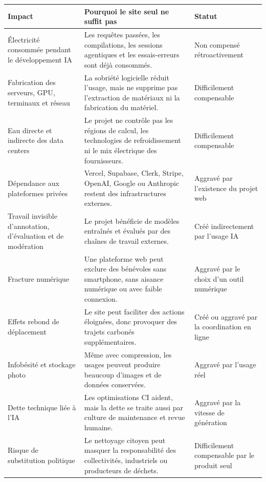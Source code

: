\documentclass[
  10pt,
  a4paper,
  DIV=11,
  numbers=noendperiod,
  oneside]{scrreprt}
\newcounter{none} %
\begin{document}
{\def\LTcaptype{none} %
\begin{longtable}[]{@{}
  >{\raggedright\arraybackslash}p{}
  >{\raggedright\arraybackslash}p{}
  >{\raggedright\arraybackslash}p{}@{}}
\toprule\noalign{}
\begin{minipage}[b]{\linewidth}\raggedright
Impact
\end{minipage} & \begin{minipage}[b]{\linewidth}\raggedright
Pourquoi le site seul ne suffit pas
\end{minipage} & \begin{minipage}[b]{\linewidth}\raggedright
Statut
\end{minipage} \\
\midrule\noalign{}
\endhead
\bottomrule\noalign{}
\endlastfoot
Électricité consommée pendant le développement IA & Les requêtes
passées, les compilations, les sessions agentiques et les essais-erreurs
sont déjà consommés. & Non compensé rétroactivement \\
Fabrication des serveurs, GPU, terminaux et réseau & La sobriété
logicielle réduit l'usage, mais ne supprime pas l'extraction de
matériaux ni la fabrication du matériel. & Difficilement compensable \\
Eau directe et indirecte des data centers & Le projet ne contrôle pas
les régions de calcul, les technologies de refroidissement ni le mix
électrique des fournisseurs. & Difficilement compensable \\
Dépendance aux plateformes privées & Vercel, Supabase, Clerk, Stripe,
OpenAI, Google ou Anthropic restent des infrastructures externes. &
Aggravé par l'existence du projet web \\
Travail invisible d'annotation, d'évaluation et de modération & Le
projet bénéficie de modèles entraînés et évalués par des chaînes de
travail externes. & Créé indirectement par l'usage IA \\
Fracture numérique & Une plateforme web peut exclure des bénévoles sans
smartphone, sans aisance numérique ou avec faible connexion. & Aggravé
par le choix d'un outil numérique \\
Effets rebond de déplacement & Le site peut faciliter des actions
éloignées, donc provoquer des trajets carbonés supplémentaires. & Créé
ou aggravé par la coordination en ligne \\
Infobésité et stockage photo & Même avec compression, les usages peuvent
produire beaucoup d'images et de données conservées. & Aggravé par
l'usage réel \\
Dette technique liée à l'IA & Les optimisations CI aident, mais la dette
se traite aussi par culture de maintenance et revue humaine. & Aggravé
par la vitesse de génération \\
Risque de substitution politique & Le nettoyage citoyen peut masquer la
responsabilité des collectivités, industriels ou producteurs de déchets.
& Difficilement compensable par le produit seul \\
\end{longtable}
}
\end{document}
